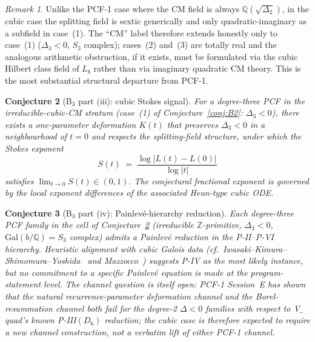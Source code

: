 \documentclass[11pt,a4paper]{article}
\newtheorem{conjecture}{Conjecture}
\theoremstyle{definition}
\theoremstyle{remark}
\newtheorem{remark}[conjecture]{Remark}
\newcommand{\Q}{\mathbb{Q}}
\newcommand{\Z}{\mathbb{Z}}
\newcommand{\Gal}{\mathrm{Gal}}
\begin{document}
\begin{remark}\label{rem:not-binary}
Unlike the PCF-1 case where the CM field is always
$\Q(\sqrt{\Delta_{2}})$, in the cubic case the splitting field is sextic
generically and only quadratic-imaginary as a subfield in case~(1). The
``CM'' label therefore extends honestly only to case~(1)
($\Delta_{3}<0$, $S_{3}$ complex); cases~(2) and~(3) are totally real
and the analogous arithmetic obstruction, if it exists, must be
formulated via the cubic Hilbert class field of $L_{b}$ rather than via
imaginary quadratic CM theory. This is the most substantial structural
departure from PCF-1.
\end{remark}

\begin{conjecture}[B$_{3}$ part (iii): cubic Stokes signal]\label{conj:B3}
For a degree-three PCF in the irreducible-cubic-CM stratum (case~(1) of
Conjecture~\ref{conj:B2}: $\Delta_{3}<0$), there exists a one-parameter
deformation $K(t)$ that preserves $\Delta_{3}<0$ in a neighbourhood of
$t=0$ and respects the splitting-field structure, under which the Stokes
exponent
\[
S(t)\;=\;\frac{\log|L(t)-L(0)|}{\log|t|}
\]
satisfies $\lim_{t\to 0}S(t)\in(0,1)$. The conjectural fractional
exponent is governed by the local exponent differences of the
associated Heun-type cubic ODE.
\end{conjecture}

\begin{conjecture}[B$_{3}$ part (iv): Painlev\'e-hierarchy reduction]\label{conj:B3iv}
Each degree-three PCF family in the cell of Conjecture~\ref{conj:B3}
(irreducible $\Z$-primitive, $\Delta_{3}<0$, $\Gal(b/\Q)=S_{3}$ complex)
admits a Painlev\'e reduction in the P-II--P-VI hierarchy. Heuristic
alignment with cubic Galois data
(cf.~Iwasaki--Kimura--Shimomura--Yoshida~\cite{Iwasaki1991} and
Mazzocco~\cite{Mazzocco2003}) suggests P-IV as the most likely
instance, but no commitment to a specific Painlev\'e equation is made
at the program-statement level. The channel question is itself open:
PCF-1 Session~E has shown that the natural recurrence-parameter
deformation channel and the Borel-resummation channel both
\emph{fail} for the degree-2 $\Delta<0$ families with respect to
V$\_$quad's known P-III$(D_{6})$ reduction; the cubic case is
therefore expected to require a new channel construction, not a
verbatim lift of either PCF-1 channel.
\end{conjecture}
\end{document}
